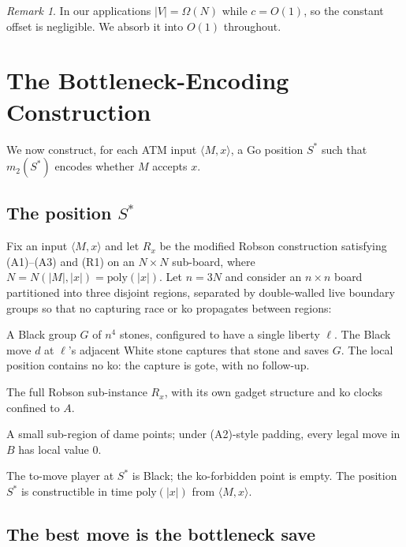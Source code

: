 \documentclass[11pt,a4paper]{amsart}
\theoremstyle{plain}
\theoremstyle{definition}
\theoremstyle{remark}
\newtheorem{remark}[theorem]{Remark}
\begin{document}
\begin{remark}
In our applications $|V| = \Omega(N)$ while $c = O(1)$, so the
constant offset is negligible. We absorb it into $O(1)$ throughout.
\end{remark}

\section{The Bottleneck-Encoding Construction}
\label{sec:bottleneck}

We now construct, for each ATM input $\langle M, x \rangle$, a Go
position $S^*$ such that $m_2(S^*)$ encodes whether $M$ accepts $x$.

\subsection{The position $S^*$}

Fix an input $\langle M, x \rangle$ and let $R_x$ be the modified
Robson construction satisfying (A1)--(A3) and (R1) on an
$N \times N$ sub-board, where $N = N(|M|, |x|) = \mathrm{poly}(|x|)$.
Let $n = 3N$ and consider an $n \times n$ board partitioned into three
disjoint regions, separated by double-walled live boundary groups so
that no capturing race or ko propagates between regions:

\begin{description}[leftmargin=3em,style=nextline]
  \item[Region $D$ (the bottleneck).]
    A Black group $G$ of $n^4$ stones, configured to have a single
    liberty $\ell$. The Black move $d$ at $\ell$'s adjacent White
    stone captures that stone and saves $G$. The local position
    contains no ko: the capture is gote, with no follow-up.
  \item[Region $A$ (the satellite carrying $R_x$).]
    The full Robson sub-instance $R_x$, with its own gadget structure
    and ko clocks confined to $A$.
  \item[Region $B$ (the dame satellite).]
    A small sub-region of dame points; under (A2)-style padding, every
    legal move in $B$ has local value $0$.
\end{description}

The to-move player at $S^*$ is Black; the ko-forbidden point is empty.
The position $S^*$ is constructible in time $\mathrm{poly}(|x|)$ from
$\langle M, x \rangle$.

\subsection{The best move is the bottleneck save}
\end{document}

